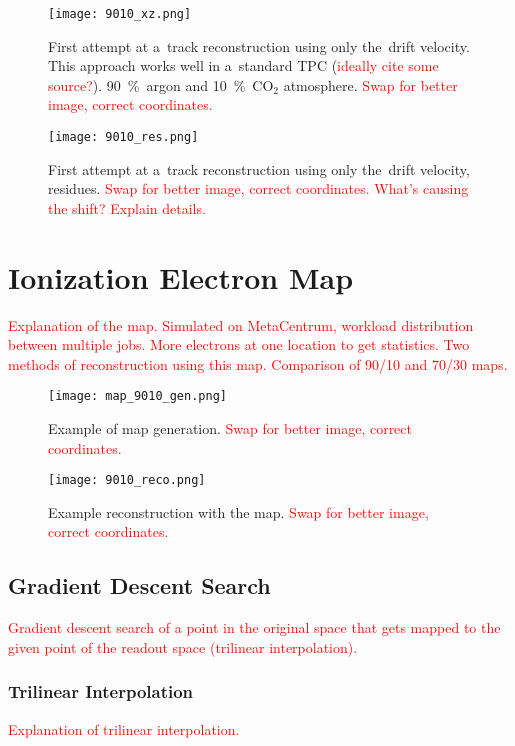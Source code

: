 		\begin{figure}
			\centering
			\texttt{[image: 9010\_xz.png]}
			\caption{First attempt at a~track reconstruction using only the~drift velocity. This approach works well in a~standard TPC (\textcolor{red}{ideally cite some source?}). 90~\%~argon and 10~\%~CO$_2$ atmosphere. \textcolor{red}{Swap for better image, correct coordinates.}}
			\label{fig:9010xz}
		\end{figure}
		
		\begin{figure}
			\centering
			\texttt{[image: 9010\_res.png]}
			\caption{First attempt at a~track reconstruction using only the~drift velocity, residues. \textcolor{red}{Swap for better image, correct coordinates. What's causing the shift? Explain details.}}
			\label{fig:9010res}
		\end{figure}
	
	\section{Ionization Electron Map}
	\label{sec:map}
		\textcolor{red}{Explanation of the map. Simulated on MetaCentrum, workload distribution between multiple jobs. More electrons at one location to get statistics. Two methods of reconstruction using this map. Comparison of 90/10 and 70/30 maps.}
		
		\begin{figure}
			\centering
			\texttt{[image: map\_9010\_gen.png]}
			\caption{Example of map generation. \textcolor{red}{Swap for better image, correct coordinates.}}
			\label{fig:map9010gen}
		\end{figure}
		
		\begin{figure}
			\centering
			\texttt{[image: 9010\_reco.png]}
			\caption{Example reconstruction with the map. \textcolor{red}{Swap for better image, correct coordinates.}}
			\label{fig:9010reco}
		\end{figure}
		
		\subsection{Gradient Descent Search}
			\textcolor{red}{Gradient descent search of a point in the original space that gets mapped to the given point of the readout space (trilinear interpolation).}
			
			\subsubsection{Trilinear Interpolation}
			\textcolor{red}{\newline Explanation of trilinear interpolation.}
		
